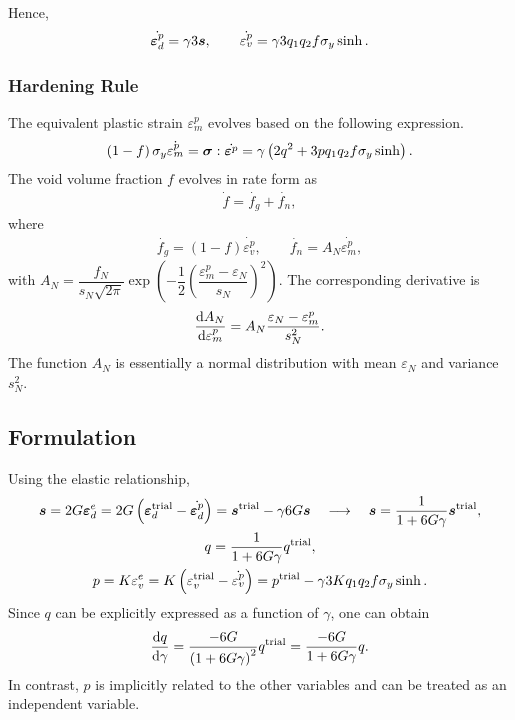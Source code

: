Hence,
\begin{gather}
    \dot{\bm{\varepsilon}^p_d}=\gamma3\bm{s},\qquad
    \dot{\varepsilon^p_v}=\gamma3q_1q_2f\sigma_y\sinh.
\end{gather}
\subsubsection{Hardening Rule}
The equivalent plastic strain $\varepsilon^p_m$ evolves based on the following expression.
\begin{gather}
\left(1-f\right)\sigma_y\dot{\varepsilon^p_m}=\bm{\sigma}:\dot{\bm{\varepsilon}^p}=\gamma\left(2q^2+3pq_1q_2f\sigma_y\sinh\right).
\end{gather}
The void volume fraction $f$ evolves in rate form as
\begin{gather}
\dot{f}=\dot{f_g}+\dot{f_n},
\end{gather}
where
\begin{gather}
\dot{f_g}=\left(1-f\right)\dot{\varepsilon^p_v},\qquad
\dot{f_n}=A_N\dot{\varepsilon^p_m},
\end{gather}
with $A_N=\dfrac{f_N}{s_N\sqrt{2\pi}}\exp\left(-\dfrac{1}{2}\left(\dfrac{\varepsilon^p_m-\varepsilon_N}{s_N}\right)^2\right)$.
The corresponding derivative is
\begin{gather}
\dfrac{\mathrm{d}A_N}{\mathrm{d}\varepsilon^p_m}=A_N\dfrac{\varepsilon_N-\varepsilon^p_m}{s_N^2}.
\end{gather}
The function $A_N$ is essentially a normal distribution with mean $\varepsilon_N$ and variance $s_N^2$.
\subsection{Formulation}
Using the elastic relationship,
\begin{gather}
    \bm{s}=2G\bm{\varepsilon}^e_d=2G\left(\bm{\varepsilon}^\text{trial}_d-\dot{\bm{\varepsilon}^p_d}\right)=\bm{s}^\text{trial}-\gamma6G\bm{s}\quad\longrightarrow\quad\bm{s}=\dfrac{1}{1+6G\gamma}\bm{s}^\text{trial},\\
    q=\dfrac{1}{1+6G\gamma}q^\text{trial},\\
    p=K\varepsilon^e_v=K\left(\varepsilon^\text{trial}_v-\dot{\varepsilon^p_v}\right)=p^\text{trial}-\gamma3Kq_1q_2f\sigma_y\sinh.
\end{gather}
Since $q$ can be explicitly expressed as a function of $\gamma$, one can obtain
\begin{gather}
    \dfrac{\mathrm{d}q}{\mathrm{d}\gamma}=\dfrac{-6G}{\left(1+6G\gamma\right)^2}q^\text{trial}=\dfrac{-6G}{1+6G\gamma}q.
\end{gather}
In contrast, $p$ is implicitly related to the other variables and can be treated as an independent variable.
